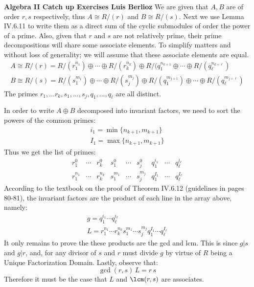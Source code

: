 \noindent\textbf{Algebra II Catch up Exercises \hspace{\fill} Luis Berlioz}
 We are given that $A,B$ are of order $r,s$ respectively, thus  $A \cong R/(r)$ and $B\cong R/(s)$. 
 Next we use Lemma IV.6.11 to write them as a direct sum of the cyclic  submodules of order the power of a prime. 
 Also, given that $r$ and $s$ are not relatively prime, their prime decompositions will share some associate elements. 
 To simplify matters and without loss of generality; we will assume that these associate elements are equal.
\begin{gather*}
    A\cong R/(r) = R/(r_1^{n_1})\oplus \cdots \oplus R/(r_k^{n_k})\oplus R/(q_1^{n_{k+1}}\oplus \cdots \oplus R/(q_\ell^{n_{k+\ell}})\\
    B\cong R/(s) = R/(s_1^{m_1})\oplus \cdots \oplus R/(s_j^{m_{j}})\oplus R/(q_1^{m_{j+1}})\oplus \cdots \oplus R/(q_\ell^{m_{j+\ell}})
\end{gather*}
The primes $r_1,\ldots r_k,s_1,\ldots,s_j,q_1,\ldots,q_\ell$ are all distinct. 

In order to write $A\oplus B$ decomposed into invariant factors, we need to sort the powers of the common primes: 
\begin{gather*}
    i_1= \min\{ n_{k+1},m_{k+1}\}\\
    I_1= \max\{ n_{k+1},m_{k+1}\}
\end{gather*}
Thus we get the list of primes:
\begin{equation*}
 \begin{matrix}
     r_1^{0}   & \cdots & r_k^{0}   & s_1^{0}   & \cdots & s_j^{0} & q_1^{i_1} & \cdots    & q_\ell^{i_\ell} \\
     r_1^{n_1} & \cdots & r_k^{n_k} & s_1^{m_1} & \cdots & s_j^{m_{j}}  & q_1^{I_1} & \cdots & q_\ell^{I_\ell}
\end{matrix} 
\end{equation*}
According to the textbook on the proof of Theorem IV.6.12 (guidelines in pages 80-81), the invariant factors are the product of each line in the array above, namely:
\begin{gather*}
    g= q_1^{i_1}\cdots q_\ell^{i_\ell}\\
    L= r_1^{n_1}  \cdots  r_k^{n_k}  s_1^{m_1}  \cdots  s_j^{m_{j}}   q_1^{I_1}  \cdots  q_\ell^{I_\ell}
\end{gather*}
It only remains to prove the these products are the gcd and lcm. 
This is since $g| s$ and $g|r$, and, for any divisor of $s$ and $r$ must divide $g$ by virtue of $R$ being a Unique Factorization Domain. Lastly, observe that:
$$\gcd(r,s)\, L = r\,s$$
Therefore it must be the case that $L$ and $\lcm(r,s)$ are associates.

